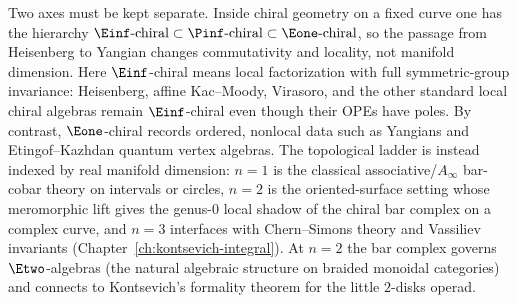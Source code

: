 Two axes must be kept separate. Inside chiral geometry on a fixed
curve one has the hierarchy
$\Einf\text{-chiral} \subset \Pinf\text{-chiral} \subset \Eone\text{-chiral}$,
so the passage from Heisenberg to Yangian changes commutativity and
locality, not manifold dimension. Here $\Einf$-chiral means local
factorization with full symmetric-group invariance: Heisenberg,
affine Kac--Moody, Virasoro, and the other standard local chiral
algebras remain $\Einf$-chiral even though their OPEs have poles.
By contrast, $\Eone$-chiral records ordered, nonlocal data such as
Yangians and Etingof--Kazhdan quantum vertex algebras. The
topological ladder is instead
indexed by real manifold dimension: $n = 1$ is the classical
associative/$A_\infty$ bar-cobar theory on intervals or circles,
$n = 2$ is the oriented-surface setting whose meromorphic lift gives
the genus-$0$ local shadow of the chiral bar complex on a complex
curve, and $n = 3$
interfaces with Chern--Simons theory and Vassiliev invariants
(Chapter~\ref{ch:kontsevich-integral}). At $n = 2$ the bar complex
governs $\Etwo$-algebras (the natural algebraic structure on braided
monoidal categories) and connects to Kontsevich's formality theorem
for the little $2$-disks operad.

